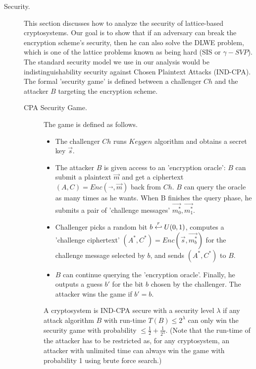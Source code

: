 \begin{description}
\item [Security.] This section discusses how to analyze the security of
  lattice-based cryptosystems. Our goal is to show that if an adversary can
  break the encryption scheme's security, then he can also solve the DLWE problem,
  which is one of the lattice problems known as being hard (SIS or $\gamma-SVP$). The standard security model we use in our analysis would be indistinguishability security against Chosen
  Plaintext Attacks (IND-CPA). The formal 'security game' is defined between a
  challenger $Ch$ and the attacker $B$ targeting the encryption scheme.

  \begin{description}
  \item[CPA Security Game.] The game is defined as follows.
    \begin{itemize}
    \item The challenger $Ch$ runs $Keygen$ algorithm and obtains a secret key
      $\vec{s}$.
    \item The attacker $B$ is given access to an 'encryption oracle': $B$ can
      submit a plaintext $\vec{m}$ and get a ciphertext
      $(A,C) = Enc(\vec{}, \vec{m})$ back from $Ch$. $B$ can query the oracle as many times as
      he wants. When B finishes the query phase, he submits a pair of
      'challenge messages' $\vec{m_0^*},\vec{m_1^*}$.
    \item Challenger picks a random bit $b \stackrel{r}{\hookleftarrow} U(0,1)$, computes a
      'challenge ciphertext' $(A^*, C^*) = Enc(\vec{s}, \vec{m_b^*})$ for the
      challenge message selected by $b$, and sends $(A^*, C^*)$ to $B$.
    \item $B$ can continue querying the 'encryption oracle'. Finally, he outputs a guess $b'$ for the bit $b$ chosen by the
      challenger. The attacker wins the game if $b' = b$.
    \end{itemize}
    \begin{definition}
       A cryptosystem is IND-CPA secure with a security level
      $\lambda$ if any attack algorithm $B$ with run-time $T(B) \leq 2^\lambda$
      can only win the security game with probability
      $\leq \frac{1}{2} + \frac{1}{2^\lambda}$.  (Note that the run-time of the attacker has to be restricted as, for any cryptosystem, an
      attacker with unlimited time can always win the game with probability 1
      using brute force search.)
      \label{def:IND-CPA Security}
    \end{definition}


\end{description}
\end{description}
